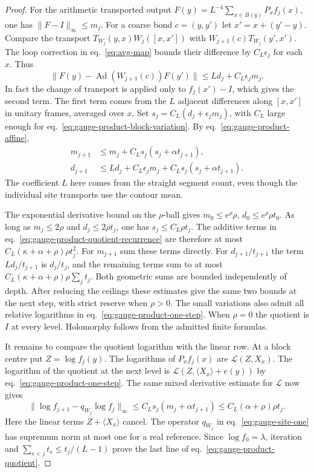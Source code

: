 \documentclass[11pt,letterpaper,reqno]{amsart}
\numberwithin{equation}{section}
\renewcommand{\eqref}[1]{\textup{eq.~\ref{#1}}}
\theoremstyle{definition}
\theoremstyle{remark}
\begin{document}
\begin{proof}
For the arithmetic transported output
\(F(y)=L^{-4}\sum_{x\in B(y)}P_xf_j(x)\), one has
\(\|F-I\|_\infty\leq m_j\).
For a coarse bond \(c=(y,y')\) let \(x'=x+(y'-y)\).
Compare the transport \(T_{W_j}(y,x)W_j([x,x'])\)
with \(W_{j+1}(c)T_{W_j}(y',x')\).
The loop correction in \eqref{eq:avg-map} bounds their
difference by \(C_L\epsilon_j\) for each \(x\).
Thus
\[
 \|F(y)-\operatorname{Ad}(W_{j+1}(c))F(y')\|
                  \leq Ld_j+C_L\epsilon_jm_j .
\]
In fact the change of transport is applied only to
\(f_j(x')-I\), which gives the second term. The first term
comes from the \(L\) adjacent differences along \([x,x']\)
in unitary frames, averaged over \(x\).
Set \(s_j=C_L(d_j+\epsilon_jm_j)\), with \(C_L\) large
enough for \eqref{eq:gauge-product-block-variation}.
By \eqref{eq:gauge-product-affine},
\begin{equation}\label{eq:gauge-product-quotient-recurrence}
 \begin{split}
 m_{j+1}&\leq m_j+C_Ls_j(s_j+\alpha t_{j+1}),\\
 d_{j+1}&\leq Ld_j+C_L\epsilon_jm_j+
                             C_Ls_j(s_j+\alpha t_{j+1}).
 \end{split}
\end{equation}
The coefficient \(L\) here comes from the straight segment count,
even though the individual site transports use the contour mean.

The exponential derivative bound on the \(\rho\)-ball gives
\(m_0\leq e^\rho\rho\), \(d_0\leq e^\rho\rho t_0\).
As long as \(m_j\leq 2\rho\) and \(d_j\leq2\rho t_j\),
one has \(s_j\leq C_L\rho t_j\). The additive terms in
\eqref{eq:gauge-product-quotient-recurrence} are therefore
at most \(C_L(\kappa+\alpha+\rho)\rho t_j^2\).
For \(m_{j+1}\) sum these terms directly. For
\(d_{j+1}/t_{j+1}\) the term \(Ld_j/t_{j+1}\) is \(d_j/t_j\),
and the remaining terms sum to at most
\(C_L(\kappa+\alpha+\rho)\rho\sum_j t_j\).
Both geometric sums are bounded independently of depth.
After reducing the ceilings these estimates give the same two
bounds at the next step, with strict reserve when \(\rho>0\).
The small variations also admit all relative logarithms in
\eqref{eq:gauge-product-one-step}. When \(\rho=0\) the quotient
is \(I\) at every level. Holomorphy follows from the admitted
finite formulas.

It remains to compare the quotient logarithm with the linear
row. At a block centre put \(Z=\log f_j(y)\).
The logarithms of \(P_x f_j(x)\) are
\(\mathcal L(Z,X_x)\). The logarithm of the quotient at the
next level is \(\mathcal L(Z,\langle X_x\rangle+e(y))\)
by \eqref{eq:gauge-product-one-step}. The same mixed
derivative estimate for \(\mathcal L\) now gives
\[
 \|\log f_{j+1}-q_{W_j}\log f_j\|_\infty
   \leq C_L s_j(m_j+\alpha t_{j+1})
   \leq C_L(\alpha+\rho)\rho t_j .
\]
Here the linear terms \(Z+\langle X_x\rangle\) cancel.
The operator \(q_{W_j}\) in \eqref{eq:gauge-site-one}
has supremum norm at most one for a real reference.
Since \(\log f_0=\lambda\), iteration and
\(\sum_{s<j}t_s\leq t_j/(L-1)\) prove the last line of
\eqref{eq:gauge-product-quotient}.
\end{proof}
\end{document}
